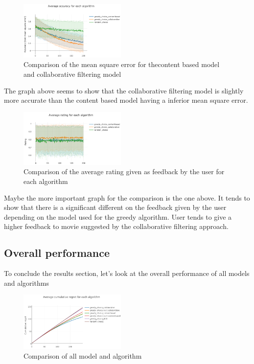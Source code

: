 \documentclass[letterpaper]{article}
\begin{document}
\begin{figure}[H]
\begin{center}
\includegraphics[width=0.47\textwidth]{img/collabo2.png}
\caption{Comparison of the mean square error for thecontent based model and collaborative filtering model}
\label{collabo2}
\end{center}
\end{figure}

The graph above seems to show that the collaborative filtering model is slightly more accurate than the content based model having a inferior mean square error.

\begin{figure}[H]
\begin{center}
\includegraphics[width=0.47\textwidth]{img/collabo3.png}
\caption{Comparison of the average rating given as feedback by the user for each algorithm}
\label{collabo3}
\end{center}
\end{figure}

Maybe the more important graph for the comparison is the one above. It tends to show that there is a significant different on the feedback given by the user depending on the model used for the greedy algorithm. User tends to give a higher feedback to movie suggested by the collaborative filtering approach.

\subsection{Overall performance}

To conclude the results section, let's look at the overall performance of all models and algorithms 

\begin{figure}[H]
\begin{center}
\includegraphics[width=0.47\textwidth]{img/greedy_all0.png}
\caption{Comparison of all model and algorithm}
\label{overallperf}
\end{center}
\end{figure}
\end{document}
